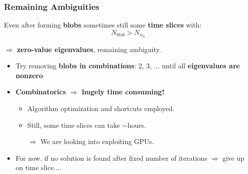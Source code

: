 \begin{frame}
  \frametitle{Remaining Ambiguities}

  Even after forming \textbf{blobs} sometimes still some \textbf{time slices} with:
  \[N_{blob} > N_{w_b}\]

  $\Rightarrow$ \textbf{zero-value eigenvalues}, remaining ambiguity.


  \begin{itemize}
  \item<2-> Try removing \textbf{blobs in
      combinations}: 2, 3, ... until all \textbf{eigenvalues are nonzero}

  \item<2-> \textbf{Combinatorics $\Rightarrow$ hugely time consuming!}  
    \begin{itemize}
    \item Algorithm optimization and shortcuts employed.
    \item Still, some time slices can take $\sim$hours.
    \item[$\Rightarrow$] We are looking into exploiting GPUs.
    \end{itemize}
  \item<2->  For now, if no solution is found after fixed number of iterations $\Rightarrow$ give up on time slice....
  \end{itemize}
\end{frame}


